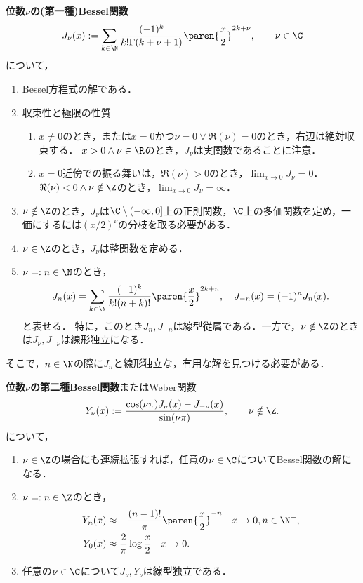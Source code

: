 \documentclass[uplatex,dvipdfmx]{jsreport}
\begin{document}
\begin{proposition}[Bessel関数]
    \textbf{位数$\nu$の(第一種)Bessel関数}
    \[J_\nu(x):=\sum_{k\in\N}\frac{(-1)^k}{k!\Gamma(k+\nu+1)}\paren{\frac{x}{2}}^{2k+\nu},\qquad\nu\in\C\]
    について，
    \begin{enumerate}
        \item Bessel方程式の解である．
        \item 収束性と極限の性質
        \begin{enumerate}
            \item $x\ne0$のとき，または$x=0$かつ$\nu=0\lor\Re(\nu)=0$のとき，右辺は絶対収束する．
            $x>0\land\nu\in\R$のとき，$J_\nu$は実関数であることに注意．
            \item $x=0$近傍での振る舞いは，$\Re(\nu)>0$のとき，$\lim_{x\to0}J_\nu=0$．$\Re(\nu)<0\land\nu\notin\Z$のとき，$\lim_{x\to0}J_\nu=\infty$．
        \end{enumerate}
        \item $\nu\notin\Z$のとき，$J_\nu$は$\C\setminus(-\infty,0]$上の正則関数，$\C$上の多価関数を定め，一価にするには$(x/2)^\nu$の分枝を取る必要がある．
        \item $\nu\in\Z$のとき，$J_\nu$は整関数を定める．
        \item $\nu=:n\in\N$のとき，
        \[J_n(x)=\sum_{k\in\N}\frac{(-1)^k}{k!(n+k)!}\paren{\frac{x}{2}}^{2k+n},\quad J_{-n}(x)=(-1)^nJ_n(x).\]
        と表せる．
        特に，このとき$J_n,J_{-n}$は線型従属である．一方で，$\nu\notin\Z$のときは$J_\nu,J_{-\nu}$は線形独立になる．
    \end{enumerate}
    そこで，$n\in\N$の際に$J_n$と線形独立な，有用な解を見つける必要がある．
\end{proposition}

\begin{proposition}[Weber関数]
    \textbf{位数$\nu$の第二種Bessel関数}またはWeber関数
    \[Y_\nu(x):=\frac{\cos(\nu\pi)J_\nu(x)-J_{-\nu}(x)}{\sin(\nu\pi)},\qquad\nu\notin\Z.\]
    について，
    \begin{enumerate}
        \item $\nu\in\Z$の場合にも連続拡張すれば，任意の$\nu\in\C$についてBessel関数の解になる．
        \item $\nu=:n\in\Z$のとき，
        \begin{align*}
            Y_n(x)&\approx-\frac{(n-1)!}{\pi}\paren{\frac{x}{2}}^{-n}\quad x\to0,n\in\N^+,\\
            Y_0(x)&\approx\frac{2}{\pi}\log\frac{x}{2}\quad x\to0.
        \end{align*}
        \item 任意の$\nu\in\C$について$J_\nu,Y_\nu$は線型独立である．
    \end{enumerate}
\end{proposition}
\end{document}
